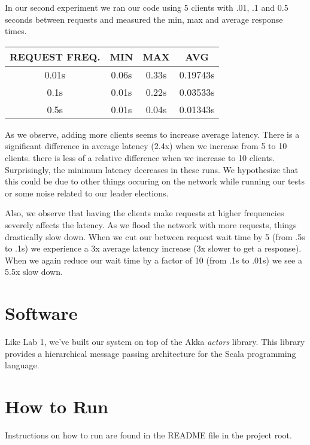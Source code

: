 \documentclass[11pt]{article}
\begin{document}
In our second experiment we ran our code using 5 clients with .01, .1
and 0.5 seconds between requests and measured the min, max and
average response times.

\begin{tabular}{c|c|c|c}
  REQUEST FREQ. & MIN & MAX & AVG \\
  \hline
  0.01s & 0.06s & 0.33s & 0.19743s \\
  0.1s  & 0.01s & 0.22s & 0.03533s \\
  0.5s  & 0.01s & 0.04s & 0.01343s \\
\end{tabular}

As we observe, adding more clients seems to increase average latency.
There is a significant difference in average latency (2.4x) when we
increase from 5 to 10 clients.  there is less of a relative difference
when we increase to 10 clients. Surprisingly, the minimum latency
decreases in these runs. We hypothesize that this could be due to
other things occuring on the network while running our tests or some
noise related to our leader elections.

Also, we observe that having the clients make requests at higher
frequencies severely affects the latency.  As we flood the network
with more requests, things drastically slow down.  When we cut our
between request wait time by 5 (from .5s to .1s) we experience a 3x
average latency increase (3x slower to get a response).  When we again
reduce our wait time by a factor of 10 (from .1s to .01s) we see a
5.5x slow down.

\section{Software}
Like Lab 1, we've built our system on top of the Akka \emph{actors}
library.  This library provides a hierarchical message passing
architecture for the Scala programming language.

\section{How to Run}
Instructions on how to run are found in the README file in the project root.
\end{document}
